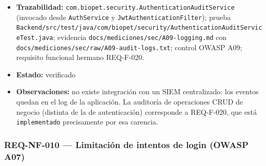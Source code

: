 \documentclass[
  spanish,
]{article}
\begin{document}
\begin{itemize}
  \texttt{substring(0,\allowbreak{}\ LONGITUD\_\allowbreak{}MAXIMA)} (criterio 6). Evidencia de
  log real en \texttt{docs/\allowbreak{}mediciones/\allowbreak{}sec/\allowbreak{}A09-\allowbreak{}logging.\allowbreak{}md} y
  \texttt{docs/\allowbreak{}mediciones/\allowbreak{}sec/\allowbreak{}raw/\allowbreak{}A09-\allowbreak{}audit-\allowbreak{}logs.\allowbreak{}txt}, con líneas
  \texttt{AUTH\_\allowbreak{}AUDIT\ event=L\allowbreak{}OGIN\_\allowbreak{}SUCCESS}, \texttt{LOGIN\_\allowbreak{}FAILURE} y
  \texttt{LOGIN\_\allowbreak{}RATE\_\allowbreak{}LIMITED} con IP, timestamp UTC y sujeto reales.
\item
  \textbf{Trazabilidad:}
  \texttt{com.\allowbreak{}biopet.\allowbreak{}security.\allowbreak{}Authentication\allowbreak{}Audit\allowbreak{}Service} (invocado
  desde \texttt{Auth\allowbreak{}Service} y \texttt{Jwt\allowbreak{}Authentication\allowbreak{}Filter}); prueba
  \texttt{Backend/\allowbreak{}src/\allowbreak{}test/\allowbreak{}java/\allowbreak{}com/\allowbreak{}biopet/\allowbreak{}security/\allowbreak{}Authentication\allowbreak{}Audit\allowbreak{}Service\allowbreak{}Test.\allowbreak{}java};
  evidencia \texttt{docs/\allowbreak{}mediciones/\allowbreak{}sec/\allowbreak{}A09-\allowbreak{}logging.\allowbreak{}md} con
  \texttt{docs/\allowbreak{}mediciones/\allowbreak{}sec/\allowbreak{}raw/\allowbreak{}A09-\allowbreak{}audit-\allowbreak{}logs.\allowbreak{}txt}; control OWASP
  A09; requisito funcional hermano REQ-F-020.
\item
  \textbf{Estado:} verificado
\item
  \textbf{Observaciones:} no existe integración con un SIEM
  centralizado: los eventos quedan en el log de la aplicación. La
  auditoría de operaciones CRUD de negocio (distinta de la de
  autenticación) corresponde a REQ-F-020, que está \texttt{implementado}
  precisamente por esa carencia.
\end{itemize}

\subsubsection{REQ-NF-010 --- Limitación de intentos de login (OWASP
A07)}\label{req-nf-010-limitaciuxf3n-de-intentos-de-login-owasp-a07}
\end{document}
